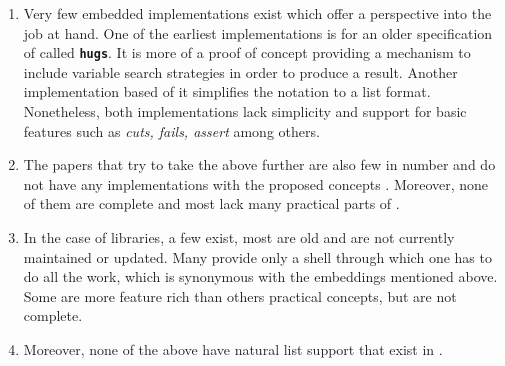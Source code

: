 \documentclass[thesis-solanki.tex]{subfiles}
\begin{document}
\begin{enumerate}
\item
  Very few embedded implementations exist which offer a perspective into the job at hand.
  One of the earliest implementations \cite{website:mini-prolog-hugs98} is for an older specification of
   called  \texttt{\bfseries{hugs}}.
  It is more of a proof of concept providing a mechanism to include variable search strategies in order to produce
  a result.
  Another implementation \cite{website:takashi-workplace} based of it simplifies the notation to a list format.
  Nonetheless, both implementations lack simplicity and support for basic  features such as
  \textit{cuts, fails, assert} among others.

\begin{comment}
\item
  Only two embeddings exist, one of them is old and made for \texttt{\bfseries{hugs}} a functional programming
  system based on the \progLang{Haskell 98} specification.
  It is complex and also lacks a lot of \progLang{Prolog} like\eref{language-like} features including \textit{cuts, fails, assert}
  among others.
  The second one is based off the first one to make it simple but it loses the variable search strategy support
  which allows the programmer to choose the manner in which a solution is produced.
\end{comment}

\item
  The papers that try to take the above further are also few in number and do not have any implementations with the
  proposed concepts \cite{spivey1999embedding, seres1999algebra, seres2001algebra, spivey2000functional, seres2000optimisation}\yyy{}{)}.
  Moreover, none of them are complete and most lack many practical parts of .

\item
  In the case of libraries, a few exist, most are old and are not currently maintained or updated.
  Many provide only a shell through which one has to
  do all the work, which is synonymous with the
  embeddings mentioned above.
  Some are  more feature rich than others practical  concepts,
  but are  not complete.

\item
  Moreover, none of the above have natural list support that exist
  in .
\end{enumerate}
\end{document}
